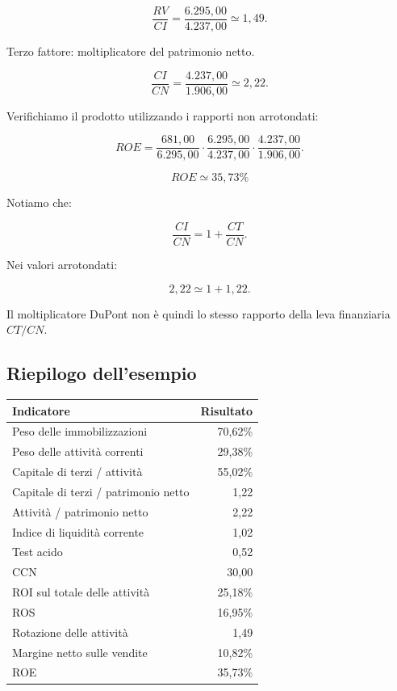 \[
\frac{RV}{CI}
=
\frac{6.295{,}00}{4.237{,}00}
\simeq
\boxed{1{,}49}.
\]

\noindent Terzo fattore:
moltiplicatore del patrimonio netto.

\[
\frac{CI}{CN}
=
\frac{4.237{,}00}{1.906{,}00}
\simeq
\boxed{2{,}22}.
\]

\noindent Verifichiamo il prodotto
utilizzando i rapporti non arrotondati:

\[
ROE=
\frac{681{,}00}{6.295{,}00}
\cdot
\frac{6.295{,}00}{4.237{,}00}
\cdot
\frac{4.237{,}00}{1.906{,}00}.
\]

\[
\boxed{ROE\simeq35{,}73\%}
\]

\noindent Notiamo che:

\[
\frac{CI}{CN}
=
1+\frac{CT}{CN}.
\]

\noindent Nei valori arrotondati:

\[
2{,}22\simeq1+1{,}22.
\]

\noindent Il moltiplicatore DuPont
non è quindi lo stesso rapporto
della leva finanziaria $CT/CN$.


\subsection*{Riepilogo dell'esempio}

\begin{center}
    \begin{tabular}{|l|r|}
        \hline
        \textbf{Indicatore}
        & \textbf{Risultato} \\
        \hline
        Peso delle immobilizzazioni & 70,62\% \\
        Peso delle attività correnti & 29,38\% \\
        Capitale di terzi / attività & 55,02\% \\
        Capitale di terzi / patrimonio netto & 1,22 \\
        Attività / patrimonio netto & 2,22 \\
        Indice di liquidità corrente & 1,02 \\
        Test acido & 0,52 \\
        CCN & 30,00 \\
        ROI sul totale delle attività & 25,18\% \\
        ROS & 16,95\% \\
        Rotazione delle attività & 1,49 \\
        Margine netto sulle vendite & 10,82\% \\
        ROE & 35,73\% \\
        \hline
    \end{tabular}
\end{center}


